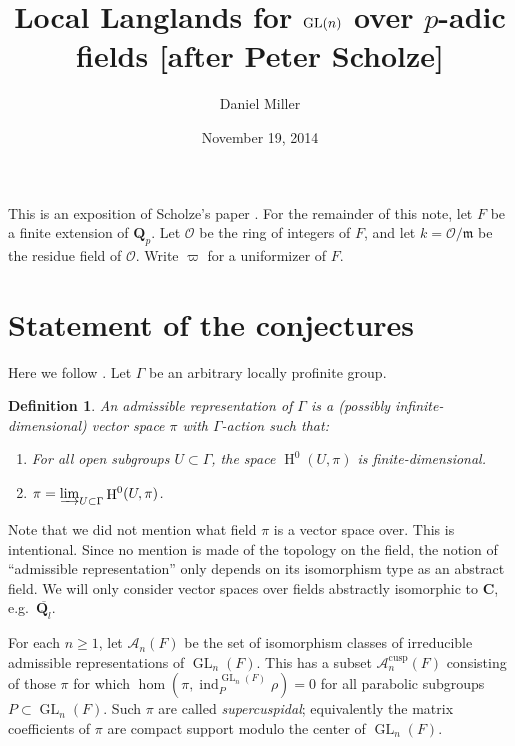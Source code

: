 \documentclass{article}
\title{Local Langlands for \texorpdfstring{$\GL(n)$}{GL(n)} over \texorpdfstring{$p$}{p}-adic fields [after Peter Scholze]}
\author{Daniel Miller}
\date{November 19, 2014}
\DeclareMathOperator{\GL}{GL}
\DeclareMathOperator{\h}{H}
\DeclareMathOperator{\induce}{ind}
\newcommand{\cA}{\mathcal{A}}
\newcommand{\cO}{\mathcal{O}}
\newcommand{\dC}{\mathbf{C}}
\newcommand{\dQ}{\mathbf{Q}}
\newcommand{\fm}{\mathfrak{m}}
\newtheorem{definition}[subsection]{Definition}
\begin{document}
\maketitle





This is an exposition of Scholze's paper \cite{scholze-2013}. For the 
remainder of this note, let $F$ be a finite extension of $\dQ_p$. Let 
$\cO$ be the ring of integers of $F$, and let $k=\cO/\fm$ be the residue field 
of $\cO$. Write $\varpi$ for a uniformizer of $F$. 





\section{Statement of the conjectures}

Here we follow \cite{wedhorn-2008}. Let $\Gamma$ be an arbitrary locally 
profinite group. 

\begin{definition}
An \emph{admissible representation of $\Gamma$} is a (possibly 
infinite-dimensional) vector space $\pi$ with $\Gamma$-action such that: 
\begin{enumerate}
  \item For all open subgroups $U\subset \Gamma$, the space 
    $\h^0(U,\pi)$ is finite-dimensional. 
  \item $\pi=\varinjlim_{U\subset \Gamma} \h^0(U,\pi)$. 
\end{enumerate}
\end{definition}

Note that we did not mention what field $\pi$ is a vector space over. This 
is intentional. Since no mention is made of the topology on the field, the 
notion of ``admissible representation'' only depends on its isomorphism type 
as an abstract field. We will only consider vector spaces over fields 
abstractly isomorphic to $\dC$, e.g.~$\overline{\dQ_l}$. 

For each $n\geqslant 1$, let $\cA_n(F)$ be the set of isomorphism classes of 
irreducible admissible representations of $\GL_n(F)$. This has 
a subset $\cA_n^\mathrm{cusp}(F)$ consisting of those $\pi$ for which 
$\hom(\pi,\induce_P^{\GL_n(F)} \rho)=0$ for all parabolic subgroups 
$P\subset \GL_n(F)$. Such $\pi$ are called \emph{supercuspidal}; equivalently 
the matrix coefficients of $\pi$ are compact support modulo the center of 
$\GL_n(F)$. 
\end{document}
